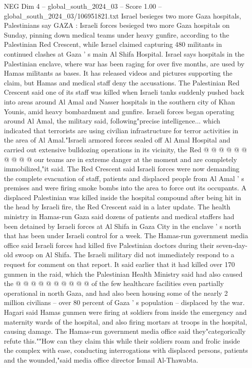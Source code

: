 \begin{textsample}{NEG Dim 4 – global\_south\_2024\_03 – Score 1.00 – global\_south\_2024\_03/106951821.txt}  \label{ex:f4_neg_358}
Israel besieges two more Gaza hospitals, Palestinians say GAZA : Israeli forces besieged two more Gaza hospitals on Sunday, pinning down medical teams under heavy gunfire, according to the Palestinian Red Crescent, while Israel claimed capturing 480 militants in continued clashes at Gaza ' s main Al Shifa Hospital.
Israel says hospitals in the Palestinian enclave, where war has been raging for over five months, are used by Hamas militants as bases.
It has released videos and pictures supporting the claim, but Hamas and medical staff deny the accusations.
The Palestinian Red Crescent said one of its staff was killed when Israeli tanks suddenly pushed back into areas around Al Amal and Nasser hospitals in the southern city of Khan Younis, amid heavy bombardment and gunfire.
Israeli forces began operating around Al Amal, the military said, following"precise intelligence... which indicated that terrorists are using civilian infrastructure for terror activities in the area of Al Amal."Israeli armored forces sealed off Al Amal Hospital and carried out extensive bulldozing operations in its vicinity, the Red @ @ @ @ @ @ @ @ @ @ our teams are in extreme danger at the moment and are completely immobilized,"it said.
The Red Crescent said Israeli forces were now demanding the complete evacuation of staff, patients and displaced people from Al Amal ' s premises and were firing smoke bombs into the area to force out its occupants.
A displaced Palestinian was killed inside the hospital compound after being hit in the head by Israeli fire, the Red Crescent said in a later update.
The health ministry in Hamas-run Gaza said dozens of patients and medical staffers had been detained by Israeli forces at Al Shifa in Gaza City in the enclave ' s north that has been under Israeli control for a week.
The Hamas-run government media office said Israeli forces had killed five Palestinian doctors during their seven-day-old swoop on Al Shifa.
The Israeli military did not immediately respond to a request for comment on that report.
It said earlier that it had killed over 170 gunmen in the raid, which the Palestinian Health Ministry said had also caused the @ @ @ @ @ @ @ @ @ @ of the few healthcare facilities even partially operational in north Gaza, and had also been housing some of the nearly 2 million civilians -- over 80 percent of Gaza ' s population -- displaced by the war.
Hagari said Hamas gunmen were firing at soldiers from inside the emergency and maternity wards of the hospital, and also firing mortars at troops in the hospital, causing damage.
The Hamas-run government media office said they"categorically refute this.""How can they claim this while their soldiers roam and frolic inside the complex with ease, conducting interrogations with displaced persons, patients and the wounded,"said media office director Ismail Al-Thawabta.

\end{textsample}

